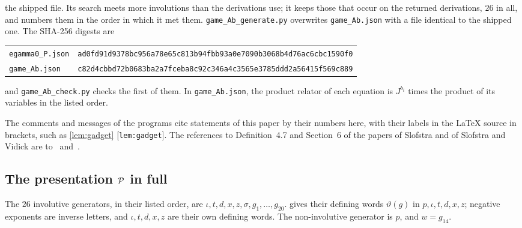 the shipped file. Its search meets more involutions than the derivations use; it keeps those that occur on the returned derivations, $26$
in all, and numbers them in the order in which it met them. \texttt{game\_Ab\_generate.py} overwrites \texttt{game\_Ab.json} with a file
identical to the shipped one. The SHA-256 digests are
\begin{center}\small
\begin{tabular}{@{}ll@{}}
\texttt{egamma0\_P.json} & \texttt{ad0fd91d9378bc956a78e65c813b94fbb93a0e7090b3068b4d76ac6cbc1590f0}\\
\texttt{game\_Ab.json} & \texttt{c82d4cbbd72b0683ba2a7fceba8c92c346a4c3565e3785ddd2a56415f569c889}
\end{tabular}
\end{center}
and \texttt{game\_Ab\_check.py} checks the first of them. In \texttt{game\_Ab.json}, the product relator of each equation is $J^{b_i}$ times
the product of its variables in the listed order.

The comments and messages of the programs cite statements of this paper by their numbers here, with their labels in the \LaTeX{} source
in brackets, such as \cref{lem:gadget} [\texttt{lem:gadget}]. The references to Definition~4.7 and Section~6 of the papers of Slofstra and of
Slofstra and Vidick are to~\cite{Slo19} and~\cite{SV18}.

\subsection{The presentation \texorpdfstring{$\mathcal P$}{P} in full}\label{cert:presentation}

The $26$ involutive generators, in their listed order, are $\iota,t,d,x,z,\sigma,g_1,\dots,g_{20}$.  gives their
defining words $\vartheta(g)$ in $p,\iota,t,d,x,z$; negative exponents are inverse letters, and $\iota,t,d,x,z$ are their own defining words.
The non-involutive generator is $p$, and $w=g_{14}$.

